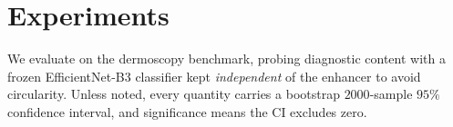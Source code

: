 %
%

\section{Experiments}\label{sec:exp}

We evaluate on the \itb{} dermoscopy benchmark, probing diagnostic content with a
frozen EfficientNet-B3 classifier kept \emph{independent} of the enhancer to avoid
circularity. Unless noted, every quantity carries a bootstrap $2000$-sample $95\%$
confidence interval, and significance means the CI excludes zero.

